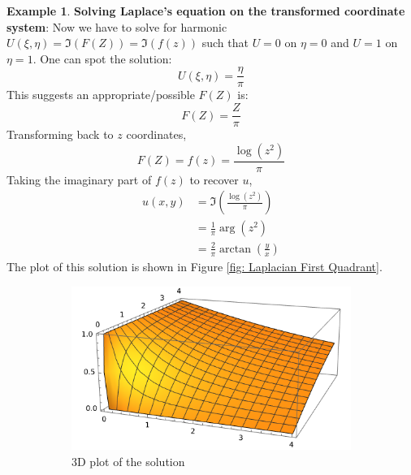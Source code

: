 \documentclass[a4paper, 12pt]{article}
\theoremstyle{definition}
\newtheorem{example}{Example}
\numberwithin{theorem}{section}
\numberwithin{definition}{section}
\numberwithin{exercise}{section}
\numberwithin{remark}{section}
\numberwithin{figure}{section}
\numberwithin{example}{section}
\begin{document}
\begin{example}
    \textbf{Solving Laplace's equation on the transformed coordinate system}:
    Now we have to solve for harmonic $U\left( \xi, \eta \right) = \Im \left( F(Z) \right) = \Im \left( f(z) \right)$ such that $U=0$ on $\eta = 0$ and $U = 1$ on $\eta = 1$.
    One can spot the solution:
    \begin{equation*}
        U\left( \xi, \eta \right) = \frac{\eta}{\pi}
    \end{equation*}
    This suggests an appropriate/possible $F(Z)$ is:
    \begin{equation*}
        F(Z) = \frac{Z}{\pi}
    \end{equation*}
    Transforming back to $z$ coordinates,
    \begin{equation*}
        F(Z) = f(z) = \frac{\log \left( z^2 \right)}{\pi} 
    \end{equation*}
    Taking the imaginary part of $f(z)$ to recover $u$,
    \begin{align*}
    u(x,y) &= \Im \left( \frac{\log \left( z^2 \right)}{\pi} \right) \\
    &= \frac{1}{\pi} \arg \left( z^2 \right) \\
    &= \frac{2}{\pi} \arctan \left( \frac{y}{x} \right)
    \end{align*}
    The plot of this solution is shown in Figure \ref{fig: Laplacian First Quadrant}.
    \begin{figure}[tbp]
        \centering
        \begin{subfigure}[b]{0.5\textwidth}
            \centering
            \includegraphics[width=\textwidth]{FanLaplacian1}
            \caption{3D plot of the solution}
        \end{subfigure}
        \hfill
        \begin{subfigure}[b]{0.5\textwidth}

\end{subfigure}
\end{figure}
\end{example}
\end{document}
